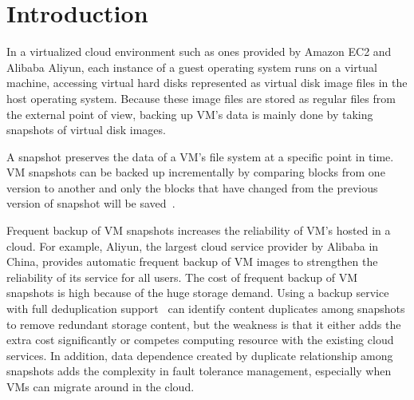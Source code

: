 \section{Introduction}


In a virtualized cloud environment such as ones provided by Amazon EC2 and Alibaba Aliyun,
each instance of a guest operating system runs on a virtual machine, accessing
virtual hard disks represented as virtual disk image files in the host operating system.
Because these image files are stored as regular files from the external point of view,
backing up VM's data is mainly done by taking snapshots of virtual disk images.

A snapshot preserves the data of a VM's file system at a specific point in time. 
VM snapshots can be  backed up  incrementally by comparing blocks from one version to another 
and only the blocks that have changed from the previous version of snapshot will be saved~\cite{Clements2009,Vrable2009}. 

Frequent  backup of VM snapshots increases  the reliability of VM's hosted in a cloud.
For example, Aliyun, the largest cloud service provider by Alibaba in China, 
provides automatic frequent backup of VM images to strengthen the reliability of its service for all users.
The cost of frequent backup of VM snapshots is  high because of the huge storage demand.
Using a backup service with full deduplication support~\cite{venti02,bottleneck08}
can identify content duplicates among snapshots to remove redundant storage content,  but the weakness is that it
either adds the  extra cost significantly or competes computing resource with the existing cloud services.
In addition, data dependence created by duplicate relationship among snapshots
adds the complexity in fault tolerance management, especially when  VMs can migrate around in the cloud. 

